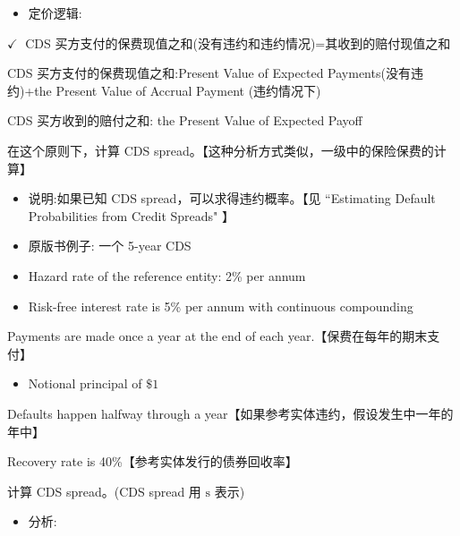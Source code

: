 \begin{itemize}
\item 定价逻辑:
\end{itemize}

\(\checkmark \;\) CDS 买方支付的保费现值之和(没有违约和违约情况)=其收到的赔付现值之和

 CDS 买方支付的保费现值之和:Present Value of Expected Payments(没有违约)+the Present Value of Accrual Payment (违约情况下)

 CDS 买方收到的赔付之和: the Present Value of Expected Payoff

在这个原则下，计算 CDS spread。【这种分析方式类似，一级中的保险保费的计算】

\begin{itemize}
\item 说明:如果已知 CDS spread，可以求得违约概率。【见 “Estimating Default Probabilities from Credit Spreads" 】
\end{itemize}

\begin{itemize}
\item 原版书例子: 一个 5-year CDS
\end{itemize}

\begin{itemize}
\item Hazard rate of the reference entity: 2\% per annum
\end{itemize}

\begin{itemize}
\item Risk-free interest rate is 5\% per annum with continuous compounding
\end{itemize}

 Payments are made once a year at the end of each year.【保费在每年的期末支付】

\begin{itemize}
\item Notional principal of \(\$ 1\)
\end{itemize}

 Defaults happen halfway through a year【如果参考实体违约，假设发生中一年的年中】

 Recovery rate is 40\%【参考实体发行的债券回收率】

计算 CDS spread。(CDS spread 用 \(\mathrm{s}\) 表示)

\begin{itemize}
\item 分析:
\end{itemize}

